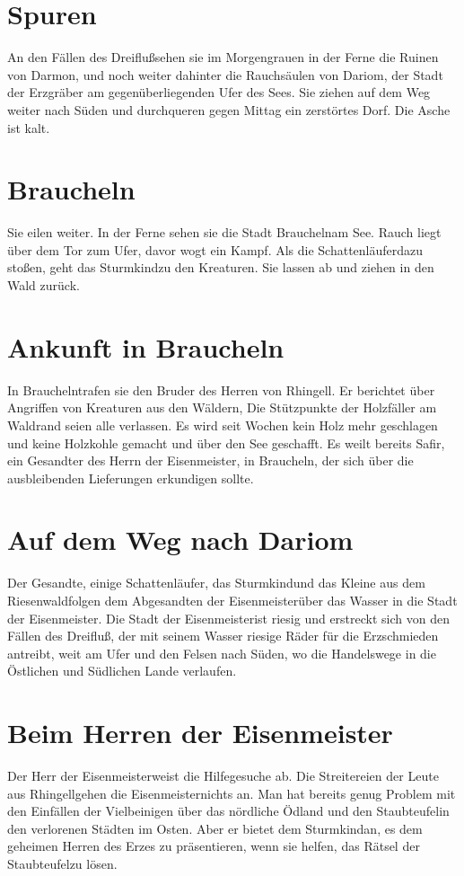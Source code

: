 \documentclass[12pt,a4paper,onecolumn,twoside,ngerman]{book}
\newcommand{\Sturmkind}{Sturmkind}
\newcommand{\Schattenlaufer}{Schattenläufer}
\newcommand{\Rhingell}{Rhingell}
\newcommand{\Dreifluss}{Dreifluß}
\newcommand{\Braucheln}{Braucheln}
\newcommand{\Darmon}{Darmon}
\newcommand{\Riesenwald}{Riesenwald}
\newcommand{\Eisenmeister}{Eisenmeister}
\newcommand{\Dariom}{Dariom}
\newcommand{\Safir}{Safir}
\newcommand{\Staubteufel}{Staubteufel}
\begin{document}
\section{Spuren}
An den Fällen des \Dreifluss sehen sie im Morgengrauen in der Ferne die Ruinen von \Darmon, und noch weiter dahinter die Rauchsäulen von \Dariom, der Stadt der Erzgräber am gegenüberliegenden Ufer des Sees. Sie ziehen auf dem Weg weiter nach Süden und durchqueren gegen Mittag ein zerstörtes Dorf. Die Asche ist kalt.

\section{\Braucheln}
Sie eilen weiter. In der Ferne sehen sie die Stadt \Braucheln am See. Rauch liegt über dem Tor zum Ufer, davor wogt ein Kampf. Als die \Schattenlaufer dazu stoßen, geht das \Sturmkind zu den Kreaturen. Sie lassen ab und ziehen in den Wald zurück.

\section{Ankunft in \Braucheln}
In \Braucheln trafen sie den Bruder des Herren von \Rhingell. Er berichtet über Angriffen von Kreaturen aus den Wäldern, Die Stützpunkte der Holzfäller am Waldrand seien alle verlassen. Es wird seit Wochen kein Holz mehr geschlagen und keine Holzkohle gemacht und über den See geschafft. Es weilt bereits \Safir, ein Gesandter des Herrn der \Eisenmeister, in \Braucheln, der sich über die ausbleibenden Lieferungen erkundigen sollte.

\section{Auf dem Weg nach \Dariom}
Der Gesandte, einige \Schattenlaufer, das \Sturmkind und das Kleine aus dem \Riesenwald folgen dem Abgesandten der \Eisenmeister über das Wasser in die Stadt der \Eisenmeister.
Die Stadt der \Eisenmeister ist riesig und erstreckt sich von den Fällen des \Dreifluss, der mit seinem Wasser riesige Räder für die Erzschmieden antreibt, weit am Ufer und den Felsen nach Süden, wo die Handelswege in die Östlichen und Südlichen Lande verlaufen.

\section{Beim Herren der \Eisenmeister}
Der Herr der \Eisenmeister weist die Hilfegesuche ab. Die Streitereien der Leute aus \Rhingell gehen die \Eisenmeister nichts an. Man hat bereits genug Problem mit den Einfällen der Vielbeinigen über das nördliche Ödland und den \Staubteufel in den verlorenen Städten im Osten. Aber er bietet dem \Sturmkind an, es dem geheimen Herren des Erzes zu präsentieren, wenn sie helfen, das Rätsel der \Staubteufel zu lösen.
\end{document}
